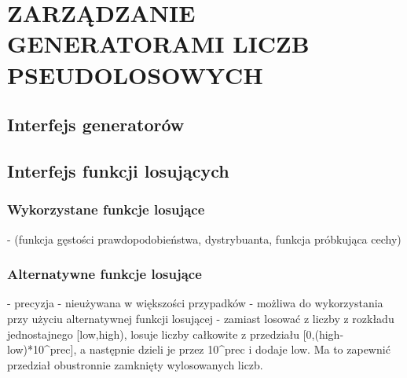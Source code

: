 \chapter{ZARZĄDZANIE GENERATORAMI LICZB PSEUDOLOSOWYCH}
\label{chpt:zarządzanie-generatorami-liczb-pseudolosowych}
\section{Interfejs generatorów}
\section{Interfejs funkcji losujących}
\subsection{Wykorzystane funkcje losujące}
- (funkcja gęstości prawdopodobieństwa, dystrybuanta, funkcja próbkująca cechy)
\subsection{Alternatywne funkcje losujące}

- precyzja
- nieużywana w większości przypadków
- możliwa do wykorzystania przy użyciu alternatywnej funkcji losującej
- zamiast losować z liczby z rozkładu jednostajnego [low,high), losuje liczby całkowite z przedziału [0,(high-low)*10^prec], a następnie dzieli je przez 10^prec i dodaje low. Ma to zapewnić przedział obustronnie zamknięty wylosowanych liczb.

